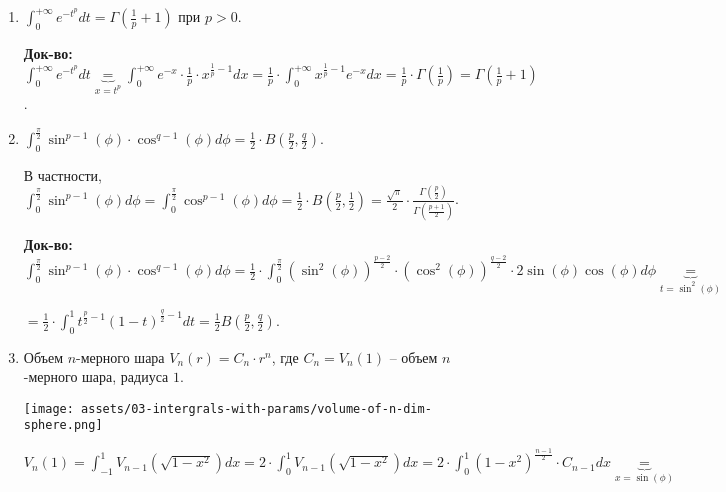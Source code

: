 \begin{example}
    \begin{enumerate}
        \item {

            $\int_{0}^{+\infty} {e^{-t^p} dt} = \Gamma\left(\frac{1}{p} + 1\right)$ при $p > 0$.

            \textbf{Док-во:} $\int_{0}^{+\infty} {e^{-t^p} dt} \underbrace{=}_{x = t^p} \int_{0}^{+\infty} { e^{-x} \cdot \frac{1}{p} \cdot x^{\frac{1}{p} - 1} dx } = \frac{1}{p} \cdot \int_{0}^{+\infty} { x^{\frac{1}{p} - 1} e^{-x} dx } = \frac{1}{p} \cdot \Gamma\left(\frac{1}{p}\right) = \Gamma\left(\frac{1}{p} + 1\right)$.
        }
        \item {

            $\int_{0}^{\frac{\pi}{2}} { \sin^{p - 1}(\phi) \cdot \cos^{q - 1}(\phi) d \phi } = \frac{1}{2} \cdot B\left(\frac{p}{2}, \frac{q}{2}\right)$.

            В частности, $\int_{0}^{\frac{\pi}{2}} { \sin^{p - 1}(\phi) d \phi } = \int_{0}^{\frac{\pi}{2}} { \cos^{p - 1}(\phi) d \phi } = \frac{1}{2} \cdot B\left(\frac{p}{2}, \frac{1}{2}\right) = \frac{\sqrt{\pi}}{2} \cdot \frac{\Gamma\left(\frac{p}{2}\right)}{\Gamma\left(\frac{p + 1}{2}\right)}$.

            \textbf{Док-во:} $\int_{0}^{\frac{\pi}{2}} { \sin^{p - 1}(\phi) \cdot \cos^{q - 1}(\phi) d \phi } = \frac{1}{2} \cdot \int_{0}^{\frac{\pi}{2}} { \left(\sin^{2}(\phi)\right)^{\frac{p-2}{2}} \cdot \left(\cos^{2}(\phi)\right)^{\frac{q-2}{2}} \cdot 2 \sin(\phi) \cos(\phi) d \phi } \underbrace{=}_{t = \sin^2(\phi)}$
            
            $= \frac{1}{2} \cdot \int_{0}^{1} {t^{\frac{p}{2} - 1} (1 - t)^{\frac{q}{2} - 1} dt } = \frac{1}{2} B\left(\frac{p}{2}, \frac{q}{2}\right)$.  \newpage
        }
        \item {
            Объем $n$-мерного шара $V_n(r) = C_n \cdot r^n$, где $C_n = V_n(1)$ -- объем $n$-мерного шара, радиуса $1$.

            \begin{center}
                \texttt{[image: assets/03-intergrals-with-params/volume-of-n-dim-sphere.png]}
            \end{center}

            $V_n(1) = \int_{-1}^{1} {V_{n - 1} \left( \sqrt{1 - x^2} \right) dx} = 2 \cdot \int_{0}^{1} { V_{n - 1} \left(\sqrt{1 - x^2}\right) dx } = 2 \cdot \int_{0}^{1} { \left(1 - x^2\right)^{\frac{n-1}{2}} \cdot C_{n-1} dx } \underbrace{=}_{x = \sin(\phi)}$
            
}
\end{enumerate}
\end{example}

